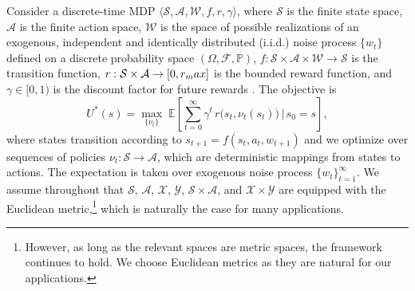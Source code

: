 \documentclass[11pt, notitlepage]{article}
\newcommand{\E}{\mathbb{E}}
\newcommand{\1}{\mathbbm{1}}
\begin{document}
Consider a discrete-time MDP $\langle \mathcal{S}, \mathcal{A}, \mathcal{W}, f, r, \gamma \rangle$, where $\mathcal{S}$ is the finite state space, $\mathcal{A}$ is the finite action space, $\mathcal{W}$ is the space of possible realizations of an exogenous, independent and identically distributed (i.i.d.) noise process $\{ w_t \}$ defined on a discrete probability space $(\Omega, \mathcal F, \mathbb P)$, $f: \mathcal{S}\times \mathcal{A} \times \mathcal{W} \rightarrow \mathcal{S}$ is the transition function, $r: \mathcal{S}\times\mathcal{A} \rightarrow [0,r_\textnormal{max}] $ is the bounded reward function, and $\gamma\in[0, 1)$ is the discount factor for future rewards \citep{puterman2014markov}. The objective is
\begin{equation} \label{eq:optimal_value}
    U^*(s) = \max_{\{\nu_t\}} \; \E \left[ \sum_{t=0}^{\infty} \gamma^t \, r\bigl(s_t,\nu_t(s_t)\bigr) \, \Bigr| \, s_0 = s \right],
\end{equation}
where states transition according to $s_{t+1} = f(s_t, a_t, w_{t+1})$ and we optimize over sequences of policies $\nu_t : \mathcal S \rightarrow \mathcal A$, which are deterministic mappings from states to actions. The expectation is taken over exogenous noise process $\{w_t\}_{t=1}^\infty$. We assume throughout that $\mathcal S$, $\mathcal A$, $\mathcal X$, $\mathcal Y$, $\mathcal S \times \mathcal A$, and $\mathcal X \times \mathcal Y$ are equipped with the Euclidean metric,\footnote{However, as long as the relevant spaces are metric spaces, the framework continues to hold. We choose Euclidean metrics as they are natural for our applications.} which is naturally the case for many applications. 
\end{document}
